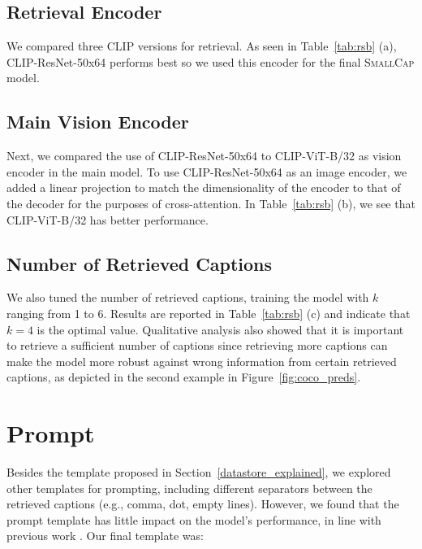 \documentclass[10pt,twocolumn,letterpaper]{article}
\newcommand{\model}{\textsc{SmallCap}\xspace}
\begin{document}
\subsection{Retrieval Encoder}
We  compared three CLIP versions for retrieval. As seen in Table~\ref{tab:rsb} (a), CLIP-ResNet-50x64 performs best so we used this encoder for the final \model model.  

\subsection{Main Vision Encoder}
Next, we compared the use of CLIP-ResNet-50x64 to CLIP-ViT-B/32 as vision encoder in the main model. To use CLIP-ResNet-50x64 as an image encoder, we added a linear projection to match the dimensionality of the encoder to that of the decoder for the purposes of cross-attention. In Table~\ref{tab:rsb} (b), we see that CLIP-ViT-B/32 has better performance. %

\subsection{Number of Retrieved Captions}
We also tuned the number of retrieved captions, training the model with $k$ ranging from 1 to 6. Results are reported in Table~\ref{tab:rsb} (c) and indicate that $k=4$ is the optimal value. Qualitative analysis also showed that it is important to retrieve a sufficient number of captions since %
retrieving more captions can make the model more robust against wrong information from certain retrieved captions, as depicted in the second example in Figure~\ref{fig:coco_preds}.



\section{Prompt}
\label{appendix_prompt}
Besides the template proposed in Section~\ref{datastore_explained}, we explored other templates for prompting, including different separators between the retrieved captions (e.g., comma, dot, empty lines). However, we found that the prompt template has little impact on the model's performance, in line with previous work \cite{jin2021good}. Our final template was:  
\newline
\end{document}
